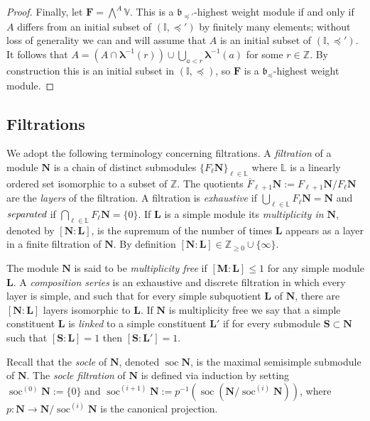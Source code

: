 \documentclass[11pt,fleqn]{amsart}
\newcommand\ZZ{\mathbb Z}
\newcommand\II{\mathbb I}
\newcommand\LL{\mathbb L}
\renewcommand\ll{{\boldsymbol \ell}}
\renewcommand\to{\longrightarrow}
\theoremstyle{definition}
\theoremstyle{remark}
\theoremstyle{remark}
\newcommand\VV{\mathbb V}
\newcommand\lie[1]{\mathfrak{#1}}
\newcommand\wt[1]{\boldsymbol{#1}}
\DeclareMathOperator\soc{soc}
\begin{document}
\begin{proof}
Finally, let $\mathbf F = \bigwedge^A \VV$. This is a $\lie 
b_{\preceq'}$-highest weight module if and only if $A$ differs from an initial
subset of $(\II,\preceq')$ by finitely many elements; without loss of 
generality we can and will assume that $A$ is an initial subset of $(\II,
\preceq')$. It follows that $A = (A \cap \wt\lambda^{-1}(r)) \cup \bigcup_{a < 
r} \wt\lambda^{-1}(a)$ for some $r \in \ZZ$. By construction this is an 
initial subset in $(\II,\preceq)$, so $\mathbf F$ is a $\lie 
b_{\preceq}$-highest weight module.
\end{proof}

\subsection{Filtrations}
We adopt the following terminology concerning filtrations. A \emph{filtration} 
of a module $\mathbf N$ is a chain of distinct submodules $\{F_\ll\mathbf 
N\}_{\ll \in \LL}$ where $\LL$ is a linearly ordered set isomorphic to a subset 
of $\ZZ$. The quotients $\overline F_{\ll+1} \mathbf N := F_{\ll+1} \mathbf N / 
F_\ll \mathbf N$ are the \emph{layers} of the filtration. A filtration is 
\emph{exhaustive} if $\bigcup_{\ll \in \LL} F_\ll \mathbf N = \mathbf N$ and $
\emph{separated}$ if $\bigcap_{\ll \in \LL} F_\ll \mathbf N = \{0\}$. If $\mathbf 
L$ is a simple module its \emph{multiplicity in $\mathbf N$}, denoted by 
$[\mathbf N: \mathbf L]$, is the supremum of the number of times $\mathbf L$ 
appears as a layer in a finite filtration of $\mathbf N$. By definition 
$[\mathbf N: \mathbf L] \in \ZZ_{\geq 0} \cup \{\infty\}$. 

The module $\mathbf N$ is said to be \emph{multiplicity free} if $[\mathbf 
M: \mathbf L] \leq 1$ for any simple module $\mathbf L$.
A \emph{composition series} is an exhaustive and discrete filtration in which 
every layer is simple, and such that for every simple subquotient $\mathbf L$ of 
$\mathbf N$, there are $[\mathbf N: \mathbf L]$ layers isomorphic to $\mathbf L$. 
If $\mathbf N$ is multiplicity free we say that a simple constituent 
$\mathbf L$ is \emph{linked} to a simple constituent $\mathbf L'$ if for every
submodule $\mathbf S \subset \mathbf N$ such that $[\mathbf S: \mathbf L] = 1$
then $[\mathbf S: \mathbf L'] = 1$.

Recall that the \emph{socle} of $\mathbf N$, denoted $\soc \mathbf N$, is the 
maximal semisimple submodule of $\mathbf N$. The \emph{socle filtration} of 
$\mathbf N$ is defined via induction by setting $\soc^{(0)} \mathbf N := \{0\}$ 
and $\soc^{(i+1)}\mathbf N := p^{-1} (\soc \left(\mathbf N /  
\soc^{(i)} \mathbf N\right))$, where $p: \mathbf N \to \mathbf N/ \soc^{(i)} 
\mathbf N$ is the canonical projection. 
\end{document}
